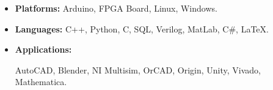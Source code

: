 \begin{itemize}
    \item 
    \textbf{Platforms:} Arduino, FPGA Board, Linux, Windows.
    \item 
    \textbf{Languages:} C++, Python, C, SQL, Verilog, MatLab, C\#, \LaTeX.
    \item 
    \textbf{Applications:} 
    \begin{minipage}[t]{\skillwidth}
        AutoCAD, Blender, NI Multisim, OrCAD, Origin, 
        Unity, Vivado, Mathematica.
    \end{minipage}
\end{itemize}

